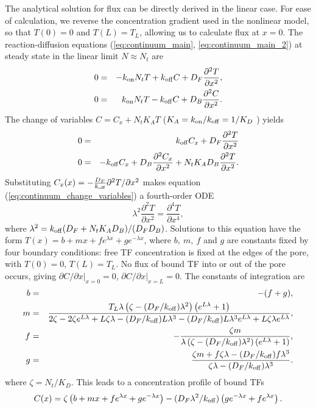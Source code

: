 The analytical solution for flux can be directly derived in the linear
case.  For ease of calculation, we reverse the concentration gradient
used in the nonlinear model, so that $T(0) = 0$ and $T(L) = T_L$, allowing
us to calculate flux at $x=0$.  The reaction-diffusion equations
(\ref{eq:continuum_main}, \ref{eq:continuum_main_2}) at steady state
in the linear limit $N \approx N_t$ are
\begin{eqnarray}
0 &=& -k_{\rm on} N_t T +k_{\rm off} C +D_F\frac{\partial^2 T}{\partial x^2},  \\ 
0 &=& k_{\rm on} N_tT -k_{\rm off} C + D_B \frac{\partial^2 C}{\partial x^2} .
\label{eq:continuum_linear} 
\end{eqnarray}
The change of variables $C = C_x + N_t K_A T$ ($K_A =  k_{\rm on} / k_{\rm off}  = 1/K_D $ ) yields
\begin{eqnarray}
  0 &=& k_{\rm off} C_x +D_F\frac{\partial^2 T}{\partial x^2}   \\ 
  0 &=& -k_{\rm off} C_x  + D_B \frac{\partial^2 C_x}{\partial x^2} + N_t
        K_A  D_B \frac{\partial^2 T}{\partial x^2}.
\label{eq:continuum_change_variables} 
\end{eqnarray}
Substituting $C_x(x) = -\frac{D_F}{k_{\rm off}}\partial^2T/\partial x^2$
makes equation (\ref{eq:continuum_change_variables}) a fourth-order
ODE
\begin{equation}
  \lambda^2 \frac{\partial^2 T}{\partial x^2} =  \frac{\partial^4
    T}{\partial x^4}, 
\label{continuum} 
\end{equation} 
where $\lambda^2 = k_{\rm off}(D_F+ N_t K_A D_B)/(D_FD_B)$.  Solutions to
this equation have the form
$T(x) = b + m x + f e^{\lambda x} + g e^{-\lambda x}$, where
$b,\ m,\ f$ and $g$ are constants fixed by four boundary conditions:
free TF concentration is fixed at the edges of the pore, with
$T(0) = 0 $, $T(L)=T_L$. No flux of bound TF into or out of the pore
occurs, giving $\partial C/\partial x |_{x=0} =0$,
$\partial C/\partial x|_{x=L} = 0$.  The constants of integration are
\begin{eqnarray}
b&=& - (f+g),\\
m & =& \frac{T_L\lambda \left( \zeta -(D_F/k_{\rm off}) {\lambda}^2\right) \left(e^{L \lambda} + 1\right)}{2  \zeta - 2  \zeta e^{L \lambda} + L  \zeta \lambda -(D_F/k_{\rm off}) L {\lambda}^3 -(D_F/k_{\rm off}) L {\lambda}^3 e^{L \lambda} + L  \zeta \lambda e^{L \lambda}},\\
f &=& -\frac{ \zeta m}{\lambda \left( \zeta -(D_F/k_{\rm off}) {\lambda}^2\right) \left(e^{L \lambda} + 1\right)},\\
g &=& \frac{ \zeta m + f  \zeta \lambda- (D_F/k_{\rm off}) f {\lambda}^3 }{ \zeta \lambda -(D_F/k_{\rm off}) {\lambda}^3}.
\end{eqnarray}
where $\zeta = N_t/K_D$. This leads to a concentration profile of bound TFs 
\begin{equation}
C(x) = \zeta \left(b + m x + f e^{\lambda x} + g e^{- \lambda
    x}\right) - (D_F{\lambda}^2/k_{\rm off})   \left(ge^{- \lambda x} + f
  e^{ \lambda x}\right). 
\end{equation}

